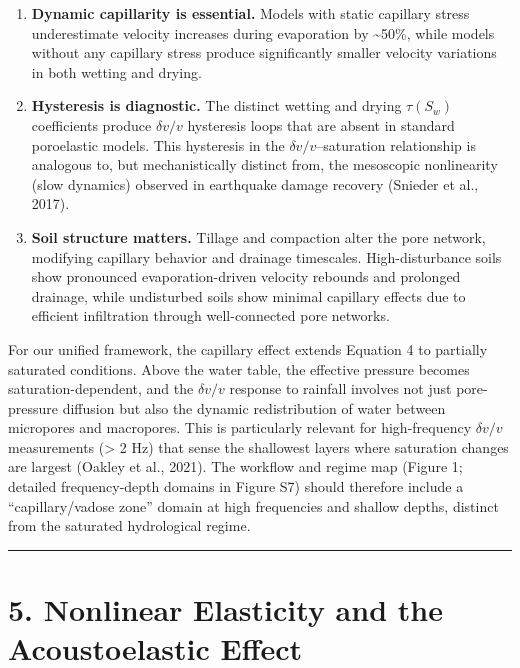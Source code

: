 \documentclass[12pt]{article}
\begin{document}
\begin{enumerate}
\def\labelenumi{\arabic{enumi}.}
\item
  \textbf{Dynamic capillarity is essential.} Models with static
  capillary stress underestimate velocity increases during evaporation
  by \textasciitilde{}50\%, while models without any capillary stress
  produce significantly smaller velocity variations in both wetting and
  drying.
\item
  \textbf{Hysteresis is diagnostic.} The distinct wetting and drying
  \(\tau(S_w)\) coefficients produce \(\delta v/v\) hysteresis loops
  that are absent in standard poroelastic models. This hysteresis in the
  \(\delta v/v\)--saturation relationship is analogous to, but
  mechanistically distinct from, the mesoscopic nonlinearity (slow
  dynamics) observed in earthquake damage recovery (Snieder et al.,
  2017).
\item
  \textbf{Soil structure matters.} Tillage and compaction alter the pore
  network, modifying capillary behavior and drainage timescales.
  High-disturbance soils show pronounced evaporation-driven velocity
  rebounds and prolonged drainage, while undisturbed soils show minimal
  capillary effects due to efficient infiltration through well-connected
  pore networks.
\end{enumerate}

For our unified framework, the capillary effect extends Equation 4 to
partially saturated conditions. Above the water table, the effective
pressure becomes saturation-dependent, and the \(\delta v/v\) response
to rainfall involves not just pore-pressure diffusion but also the
dynamic redistribution of water between micropores and macropores. This
is particularly relevant for high-frequency \(\delta v/v\) measurements
(\textgreater{} 2 Hz) that sense the shallowest layers where saturation
changes are largest (Oakley et al., 2021). The workflow and regime map
(Figure 1; detailed frequency-depth domains in Figure S7) should
therefore include a ``capillary/vadose zone'' domain at high frequencies
and shallow depths, distinct from the saturated hydrological regime.

\begin{center}\rule{0.5\linewidth}{0.5pt}\end{center}

\section{5. Nonlinear Elasticity and the Acoustoelastic
Effect}\label{nonlinear-elasticity-and-the-acoustoelastic-effect}
\end{document}
